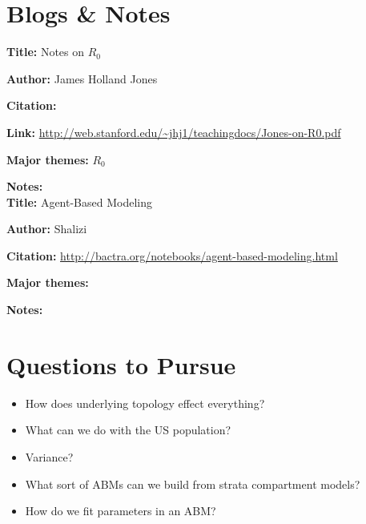 \message{ !name(refs.tex)}\documentclass{article}
\begin{document}
\section{Blogs \& Notes}

\textbf{Title:} Notes on $R_0$

\textbf{Author:} James Holland Jones

\textbf{Citation:} \cite{jonesjh2007}

\textbf{Link:} \url{http://web.stanford.edu/~jhj1/teachingdocs/Jones-on-R0.pdf}


\textbf{Major themes:} $R_0$

\textbf{Notes:}
\\

\textbf{Title:} Agent-Based Modeling

\textbf{Author:} Shalizi

\textbf{Citation:} \url{http://bactra.org/notebooks/agent-based-modeling.html}

\textbf{Major themes:} 

\textbf{Notes:}
\\





\section{Questions to Pursue}

\begin{itemize}
\item How does underlying topology effect everything?
\item What can we do with the US population?
\item Variance?
\item What sort of ABMs can we build from strata compartment models?
\item How do we fit parameters in an ABM?
\end{itemize}


\end{document}
